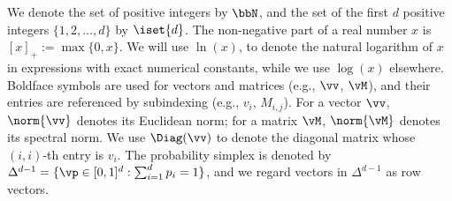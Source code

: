 We denote the set of positive integers by $\bbN$, and
the set of the first $d$ positive integers $\{1,2,\dotsc,d\}$ by $\iset{d}$.
The non-negative part of a real number $x$ is $[x]_+ := \max\{0,x\}$.
We will use $\ln(x)$, to denote the natural logarithm of $x$
in expressions with exact numerical constants,
while we use $\log(x)$ elsewhere.
Boldface symbols are used for vectors and matrices (e.g., $\vv$,
$\vM$), and their entries are referenced by subindexing (e.g., $v_i$,
$M_{i,j}$).
For a vector $\vv$, $\norm{\vv}$ denotes its Euclidean norm; for a
matrix $\vM$, $\norm{\vM}$ denotes its spectral norm.
We use $\Diag(\vv)$ to denote the diagonal matrix whose $(i,i)$-th
entry is $v_i$.
The probability simplex is denoted by $\Delta^{d-1} = \{ \vp
\in [0,1]^d : \sum_{i=1}^d p_i = 1 \}$, and we regard vectors in
$\Delta^{d-1}$ as row vectors.
